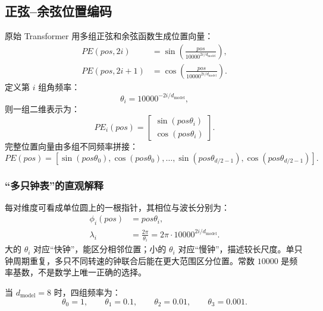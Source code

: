\documentclass[UTF8,fontset=none,a4paper,10pt]{ctexart}
\begin{document}
\subsection{正弦--余弦位置编码}

原始 Transformer 用多组正弦和余弦函数生成位置向量\cite{vaswani2017}：
\begin{align}
  PE(pos,2i)&=\sin\!\left(\frac{pos}{10000^{2i/d_{\text{model}}}}\right), \label{eq:sin-pe}\\
  PE(pos,2i+1)&=\cos\!\left(\frac{pos}{10000^{2i/d_{\text{model}}}}\right). \label{eq:cos-pe}
\end{align}
定义第 $i$ 组角频率：
\begin{equation}
  \theta_i=10000^{-2i/d_{\text{model}}},
  \label{eq:sin-theta}
\end{equation}
则一组二维表示为：
\begin{equation}
  PE_i(pos)=
  \begin{bmatrix}
    \sin(pos\theta_i)\\
    \cos(pos\theta_i)
  \end{bmatrix}.
  \label{eq:sin-pair}
\end{equation}
完整位置向量由多组不同频率拼接：
\begin{equation}
  PE(pos)=[\sin(pos\theta_0),\cos(pos\theta_0),\ldots,
  \sin(pos\theta_{d/2-1}),\cos(pos\theta_{d/2-1})].
  \label{eq:sin-full}
\end{equation}

\subsubsection{“多只钟表”的直观解释}

每对维度可看成单位圆上的一根指针，其相位与波长分别为：
\begin{align}
  \phi_i(pos)&=pos\theta_i, \label{eq:phase}\\
  \lambda_i&=\frac{2\pi}{\theta_i}=2\pi\cdot10000^{2i/d_{\text{model}}}. \label{eq:wavelength}
\end{align}
大的 $\theta_i$ 对应“快钟”，能区分相邻位置；小的 $\theta_i$ 对应“慢钟”，描述较长尺度。单只钟周期重复，多只不同转速的钟联合后能在更大范围区分位置。常数 $10000$ 是频率基数，不是数学上唯一正确的选择。

当 $d_{\text{model}}=8$ 时，四组频率为：
\begin{equation}
  \theta_0=1,\qquad \theta_1=0.1,\qquad
  \theta_2=0.01,\qquad \theta_3=0.001.
  \label{eq:d8-frequency}
\end{equation}
\end{document}
